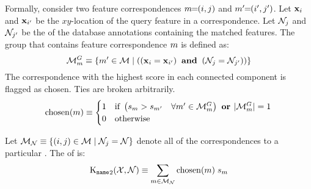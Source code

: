             \newcommand{\MatchesGroup}{\Matches^{G}}

            Formally, consider two feature correspondences $m\mkern-6mu=\mkern-6mu(i, j)$ and $m'\mkern-6mu=\mkern-6mu(i',
              j')$.
            Let $\mathbf{x}_{i}$ and $\mathbf{x}_{i'}$ be the $xy$-location of the query feature in a correspondence.
            Let $\mathcal{N}_{j}$ and $\mathcal{N}_{j'}$ be the \name{} of the database annotations containing the matched
              features.
            The group that contains feature correspondence $m$ is defined as:
            \begin{equation}
                \MatchesGroup_{\mI} \eqv \curly{\mII \in \Matches  \where
                \paren{
                    \paren{\pt_{\iI} \eq \pt_{\iII}} \AND 
                    \paren{\nid_{\jI} \eq \nid_{\jII}}
                }
            }
            \end{equation}
            The correspondence with the highest score in each connected component is flagged as chosen.
            Ties are broken arbitrarily.
            \begin{equation}
                \ischosen(\mI) \eqv 
                \bincase{
                \paren{
                    \fs_{\mI} > \fs_{\mII} 
                    \quad \forall \mII  \in \MatchesGroup_{\mI}
                } 
                \OR
                \card{\MatchesGroup_{\mI}} \eq 1
                }
            \end{equation}

            Let $\mathcal{M}_{\mathcal{N}} \equiv \{(i, j) \in \mathcal{M} \mid
              \mathcal{N}_j = \mathcal{N}\}$ denote all of the correspondences to a particular
              \name{}.
            The \nscore{} of \aan{\name{}} is:
            \begin{equation}
                \operatorname{K_{\tt name}}_2(\mathcal{X}, \mathcal{N}) 
                \equiv 
                \sum_{m \in \mathcal{M}_{\mathcal{N}}} \operatorname{chosen}(m) \; s_m
            \end{equation}

            \namematch{}

